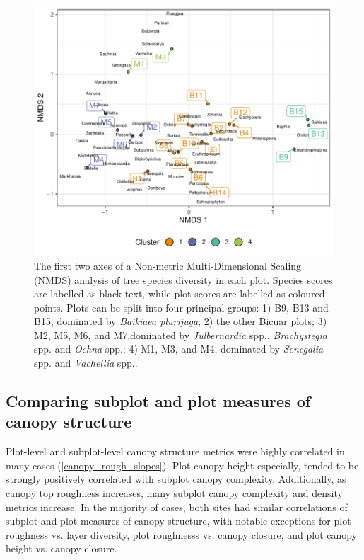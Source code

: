 \documentclass[11pt,a4paper]{article}
\begin{document}
\begin{figure}
	\includegraphics[width=\textwidth]{nmds}
	\caption{The first two axes of a Non-metric Multi-Dimensional Scaling (NMDS) analysis of tree species diversity in each plot. Species scores are labelled as black text, while plot scores are labelled as coloured points. Plots can be split into four principal groups: 1) B9, B13 and B15, dominated by \textit{Baikiaea plurijuga}; 2) the other Bicuar plots; 3) M2, M5, M6, and M7,dominated by \textit{Julbernardia} spp., \textit{Brachystegia} spp. and \textit{Ochna} spp.; 4) M1, M3, and M4, dominated by \textit{Senegalia} spp. and \textit{Vachellia} spp..}
	\label{nmds}
\end{figure}

\subsection{Comparing subplot and plot measures of canopy structure}

Plot-level and subplot-level canopy structure metrics were highly correlated in many cases (\autoref{canopy_rough_slopes}). Plot canopy height especially, tended to be strongly positively correlated with subplot canopy complexity. Additionally, as canopy top roughness increases, many subplot canopy complexity and density metrics increase. In the majority of cases, both sites had similar correlations of subplot and plot measures of canopy structure, with notable exceptions for plot roughness vs. layer diversity, plot roughnesss vs. canopy closure, and plot canopy height vs. canopy closure.
\end{document}
